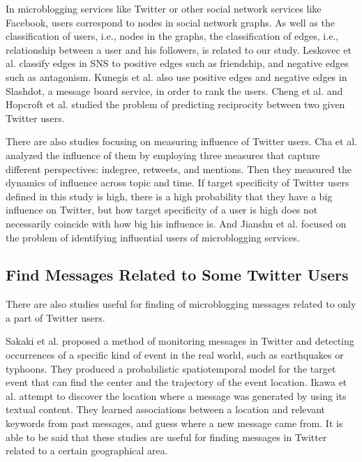 In microblogging services like Twitter or other social network services
like Facebook, users correspond to nodes in social network graphs. As
well as the classification of users, i.e., nodes in the graphs, the
classification of edges, i.e., relationship between a user and his
followers, is related to our study. Leskovec et
al.\cite{leskovec2010predicting,leskovec2010signed} classify edges in
SNS to positive edges such as friendship, and negative edges such as
antagonism. Kunegis et al.\cite{kunegis2009slashdot} also use positive
edges and negative edges in Slashdot, a message board service, in order
to rank the users. Cheng et al.\cite{cheng2011predicting} and Hopcroft
et al.\cite{hopcroft2011will} studied the problem of predicting
reciprocity between two given Twitter users.

There are also studies focusing on measuring influence of Twitter
users.  Cha et al.\cite{cha2010measuring} analyzed the influence of them
by employing three measures that capture different perspectives:
indegree, retweets, and mentions.  Then they measured the dynamics of
influence across topic and time.  If target specificity of Twitter users
defined in this study is high, there is a high probability that they
have a big influence on Twitter, but how target specificity of a user is
high does not necessarily coincide with how big his influence is. And
Jianshu et al.\cite{weng2010twitterrank} focused on the problem of
identifying influential users of microblogging services.

\subsection{Find Messages Related to Some Twitter Users}
\label{subsec:Some User}

There are also studies useful for finding of microblogging messages
related to only a part of Twitter users.

Sakaki et al.\cite{sakaki2010earthquake} proposed a method of monitoring
messages in Twitter and detecting occurrences of a specific kind of event
in the real world, such as earthquakes or typhoons.  They produced a
probabilistic spatiotemporal model for the target event that can find
the center and the trajectory of the event location.  Ikawa et
al.\cite{ikawa2012location} attempt to discover the location where a
message was generated by using its textual content.  They learned
associations between a location and relevant keywords from past
messages, and guess where a new message came from.  It is able to be
said that these studies are useful for finding messages in Twitter
related to a certain geographical area.

